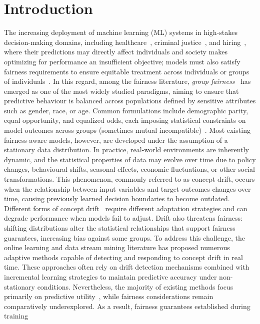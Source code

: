 \documentclass[sigconf,anonymous,review]{acmart}
\begin{document}
\section{Introduction}
The increasing deployment of machine learning (ML) systems in high-stakes decision-making domains, including healthcare~\cite{8474918}, criminal justice~\cite{10467221}, 
and hiring~\cite{10.1145/3351095.3372828}, where their predictions may directly affect individuals and society makes optimizing for performance an insufficient objective; 
models must also satisfy fairness requirements to ensure equitable treatment across individuals or groups of individuals~\cite{10.1145/3457607}. In this regard,  
among the fairness literature, \emph{group fairness}~\cite{10.1145/2090236.2090255} has emerged as one of the most widely studied paradigms, aiming to ensure that predictive behaviour is
balanced across populations defined by sensitive attributes such as gender, race, or age. Common formulations include demographic parity, equal 
opportunity, and equalized odds, each imposing statistical constraints on model outcomes across groups (sometimes mutual incompatible)~\cite{10.1145/2090236.2090255,NIPS2016_6a9659fe}.
Most existing fairness-aware models, however, are developed under the assumption of a stationary data distribution. In practice, 
real-world environments are inherently dynamic, and the statistical properties of data may evolve over time due to policy changes, behavioural 
shifts, seasonal effects, economic fluctuations, or other social transformations. This phenomenon, commonly referred to as concept drift, 
occurs when the relationship between input variables and target outcomes changes over time, causing previously learned decision boundaries to 
become outdated. Different forms of concept drift~\cite{DBLP:journals/corr/WebbHCNP15} require different adaptation strategies and can degrade performance when models fail to adjust. 
Drift also threatens fairness: shifting distributions alter the statistical relationships that support fairness guarantees, increasing bias against some groups.
To address this challenge, the online learning and data stream mining literature has proposed numerous adaptive methods capable of detecting and 
responding to concept drift in real time. These approaches often rely on drift detection mechanisms combined with incremental learning 
strategies to maintain predictive accuracy under non-stationary conditions. Nevertheless, the majority of existing methods focus primarily on 
predictive utility~\cite{10.1007/s10994-017-5642-8, KLAIBER20231261}, while fairness considerations remain comparatively underexplored. As a result, fairness guarantees established during training 
\end{document}
